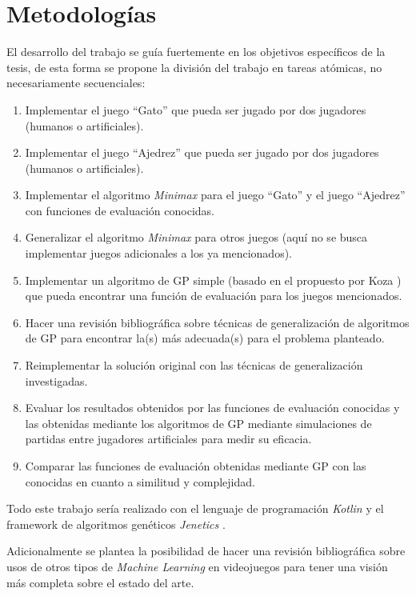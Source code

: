 \section{Metodologías}
  El desarrollo del trabajo se guía fuertemente en los objetivos específicos de la tesis, de esta 
  forma se propone la división del trabajo en tareas atómicas, no necesariamente secuenciales:

  \begin{enumerate}
    \item Implementar el juego \enquote{Gato} que pueda ser jugado por dos jugadores (humanos o 
      artificiales).
    \item Implementar el juego \enquote{Ajedrez} que pueda ser jugado por dos jugadores (humanos o 
      artificiales).
    \item Implementar el algoritmo \textit{Minimax} para el juego \enquote{Gato} y el juego 
      \enquote{Ajedrez} con funciones de evaluación conocidas.
    \item Generalizar el algoritmo \textit{Minimax} para otros juegos (aquí no se busca implementar
      juegos adicionales a los ya mencionados).
    \item Implementar un algoritmo de GP simple (basado en el propuesto por Koza 
      \cite{kozaGeneticProgrammingMeans1994a}) que pueda encontrar una función de evaluación para
      los juegos mencionados.
    \item Hacer una revisión bibliográfica sobre técnicas de generalización de algoritmos de GP para 
      encontrar la(s) más adecuada(s) para el problema planteado.
    \item Reimplementar la solución original con las técnicas de generalización investigadas.
    \item Evaluar los resultados obtenidos por las funciones de evaluación conocidas y las obtenidas 
      mediante los algoritmos de GP mediante simulaciones de partidas entre jugadores artificiales
      para medir su eficacia.
    \item Comparar las funciones de evaluación obtenidas mediante GP con las conocidas en cuanto a
      similitud y complejidad.
  \end{enumerate}

  Todo este trabajo sería realizado con el lenguaje de programación \textit{Kotlin} 
  \cite{KotlinProgrammingLanguage} y el framework de algoritmos genéticos \textit{Jenetics} 
  \cite{wilhelmstotterJeneticsJavaGenetic}.

  Adicionalmente se plantea la posibilidad de hacer una revisión bibliográfica sobre usos de otros 
  tipos de \textit{Machine Learning} en videojuegos para tener una visión más completa sobre el 
  estado del arte.
